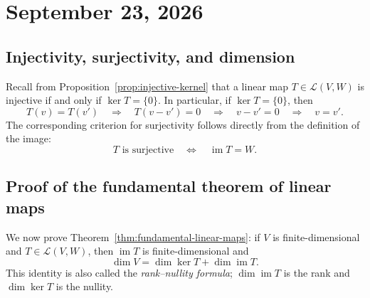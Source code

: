 \section{September 23, 2026}

\subsection{Injectivity, surjectivity, and dimension}

Recall from Proposition~\ref{prop:injective-kernel} that a linear map
$T\in\mathcal L(V,W)$ is injective if and only if $\ker T=\{0\}$.
In particular, if $\ker T=\{0\}$, then
\[
  T(v)=T(v')
  \quad\Longrightarrow\quad T(v-v')=0
  \quad\Longrightarrow\quad v-v'=0
  \quad\Longrightarrow\quad v=v'.
\]
The corresponding criterion for surjectivity follows directly from
the definition of the image:
\[
  T\text{ is surjective}
  \quad\Longleftrightarrow\quad \operatorname{im}T=W.
\]

\subsection{Proof of the fundamental theorem of linear maps}

We now prove Theorem~\ref{thm:fundamental-linear-maps}: if $V$ is
finite-dimensional and $T\in\mathcal L(V,W)$, then
$\operatorname{im}T$ is finite-dimensional and
\[
  \dim V=\dim\ker T+\dim\operatorname{im}T.
\]
This identity is also called the \emph{rank--nullity formula};
$\dim\operatorname{im}T$ is the rank and $\dim\ker T$ is the nullity.

